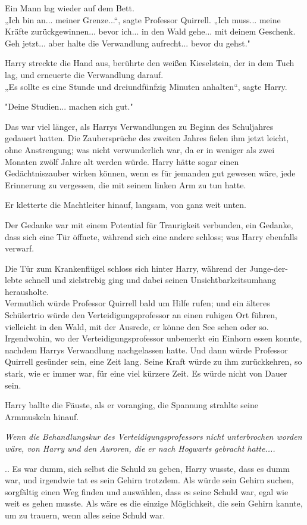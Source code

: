 {Ein Mann lag wieder auf dem Bett.\\ „Ich bin an... meiner Grenze...“, sagte Professor Quirrell. „Ich muss... meine Kräfte zurückgewinnen... bevor ich... in den Wald gehe... mit deinem Geschenk. Geh jetzt... aber halte die Verwandlung aufrecht... bevor du gehst."

Harry streckte die Hand aus, berührte den weißen Kieselstein, der in dem Tuch lag, und erneuerte die Verwandlung darauf.\\ „Es sollte es eine Stunde und dreiundfünfzig Minuten anhalten“, sagte Harry.

"Deine Studien... machen sich gut."

Das war viel länger, als Harrys Verwandlungen zu Beginn des Schuljahres gedauert hatten. Die Zaubersprüche des zweiten Jahres fielen ihm jetzt leicht, ohne Anstrengung; was nicht verwunderlich war, da er in weniger als zwei Monaten zwölf Jahre alt werden würde. Harry hätte sogar einen Gedächtniszauber wirken können, wenn es für jemanden gut gewesen wäre, jede Erinnerung zu vergessen, die mit seinem linken Arm zu tun hatte.

Er kletterte die Machtleiter hinauf, langsam, von ganz weit unten.

Der Gedanke war mit einem Potential für Traurigkeit verbunden, ein Gedanke, dass sich eine Tür öffnete, während sich eine andere schloss; was Harry ebenfalls verwarf.

Die Tür zum Krankenflügel schloss sich hinter Harry, während der Junge-der-lebte schnell und zielstrebig ging und dabei seinen Unsichtbarkeitsumhang herausholte.\\ Vermutlich würde Professor Quirrell bald um Hilfe rufen; und ein älteres Schülertrio würde den Verteidigungsprofessor an einen ruhigen Ort führen, vielleicht in den Wald, mit der Ausrede, er könne den See sehen oder so. Irgendwohin, wo der Verteidigungsprofessor unbemerkt ein Einhorn essen konnte, nachdem Harrys Verwandlung nachgelassen hatte. Und dann würde Professor Quirrell gesünder sein, eine Zeit lang. Seine Kraft würde zu ihm zurückkehren, so stark, wie er immer war, für eine viel kürzere Zeit. Es würde nicht von Dauer sein.

Harry ballte die Fäuste, als er voranging, die Spannung strahlte seine Armmuskeln hinauf.

\emph{Wenn die Behandlungskur des Verteidigungsprofessors nicht unterbrochen worden wäre, von Harry und den Auroren, die er nach Hogwarts gebracht hatte....}

.. Es war dumm, sich selbst die Schuld zu geben, Harry wusste, dass es dumm war, und irgendwie tat es sein Gehirn trotzdem. Als würde sein Gehirn suchen, sorgfältig einen Weg finden und auswählen, dass es seine Schuld war, egal wie weit es gehen musste. Als wäre es die einzige Möglichkeit, die sein Gehirn kannte, um zu trauern, wenn alles seine Schuld war.

}
